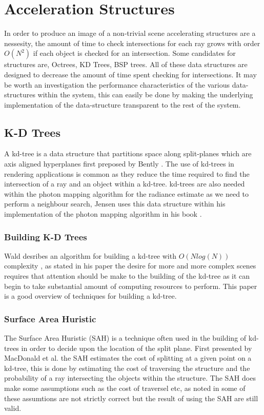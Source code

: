 \section{Acceleration Structures}
In order to produce an image of a non-trivial scene accelerating structures are a nessesity, the
amount of time to check intersections for each ray grows with order  $O(N^2)$ if each object is
checked for an intersection. Some candidates for structures are, Octrees, KD Trees, BSP trees. All
of these data structures are designed to decrease the amount of time spent checking for 
intersections. It may be worth an investigation the performance characteristics of the various
data-structures within the system, this can easily be done by making the underlying implementation
of the data-structure transparent to the rest of the system.

\subsection{K-D Trees}
A kd-tree is a data structure that partitions space along split-planes which are axis aligned
hyperplanes first preposed by Bently \cite{Bently75}.
The use of kd-trees in rendering applications is common as they reduce the time
required to find the intersection of a ray and an object within a kd-tree. kd-trees are also needed
within the photon mapping algorithm for the radiance estimate as we need to perform a
neighbour search, Jensen uses this data structure within his implementation of the photon mapping
algorithm in his book \cite{JensenBook}.

\subsubsection{Building K-D Trees}
Wald desribes an algorithm for building a kd-tree with $O(N log(N))$ complexity \cite{Wald06}, as stated in his
paper the desire for more and more complex scenes requires that attention should be make to the 
building of the kd-tree as it can begin to take substantial amount of computing resources to
perform. This paper is a good overview of techniques for building a kd-tree.

\subsubsection{Surface Area Huristic}
The Surface Area Huristic (SAH) is a technique often used in the building of kd-trees in order to
decide upon the location of the split plane. First presented by MacDonald et al. \cite{MacDonald90}
the SAH estimates the cost of splitting at a given point on a kd-tree, this is done by estimating the
cost of traversing the structure and the probability of a ray intersecting the objects within the
structure. The SAH does make some assumptions such as the cost of traversel etc, as noted in
\cite{Wald06} some of these assumtions are not strictly correct but the result of using the SAH
are still valid.

